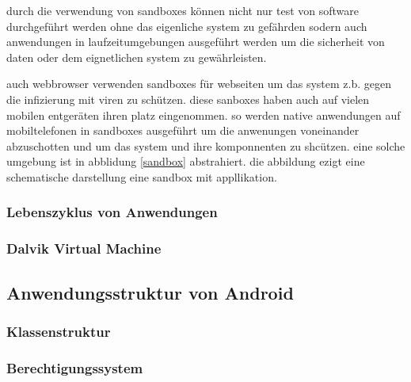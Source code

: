 durch die verwendung von sandboxes können nicht nur test von software durchgeführt werden ohne das eigenliche system zu gefährden sodern auch anwendungen in laufzeitumgebungen ausgeführt werden um die sicherheit von daten oder dem eignetlichen system zu gewährleisten. 

auch webbrowser verwenden sandboxes für webseiten um das  system z.b. gegen die infizierung mit viren zu schützen. diese sanboxes haben auch auf vielen mobilen entgeräten ihren platz eingenommen. so werden native anwendungen auf mobiltelefonen in sandboxes ausgeführt um die anwenungen voneinander abzuschotten und um das system und ihre komponnenten zu shcützen. eine solche umgebung ist in abblidung \ref{sandbox} abstrahiert. die abbildung ezigt eine schematische darstellung eine sandbox mit appllikation.

\subsubsection{Lebenszyklus von Anwendungen}
\subsubsection{Dalvik Virtual Machine}
\subsection{Anwendungsstruktur von Android}
\subsubsection{Klassenstruktur}
\subsubsection{Berechtigungssystem}

